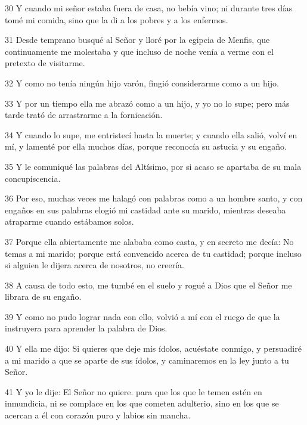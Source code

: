 \par 30 Y cuando mi señor estaba fuera de casa, no bebía vino; ni durante tres días tomé mi comida, sino que la di a los pobres y a los enfermos.

\par 31 Desde temprano busqué al Señor y lloré por la egipcia de Menfis, que continuamente me molestaba y que incluso de noche venía a verme con el pretexto de visitarme.

\par 32 Y como no tenía ningún hijo varón, fingió considerarme como a un hijo.

\par 33 Y por un tiempo ella me abrazó como a un hijo, y yo no lo supe; pero más tarde trató de arrastrarme a la fornicación.

\par 34 Y cuando lo supe, me entristecí hasta la muerte; y cuando ella salió, volví en mí, y lamenté por ella muchos días, porque reconocía su astucia y su engaño.

\par 35 Y le comuniqué las palabras del Altísimo, por si acaso se apartaba de su mala concupiscencia.

\par 36 Por eso, muchas veces me halagó con palabras como a un hombre santo, y con engaños en sus palabras elogió mi castidad ante su marido, mientras deseaba atraparme cuando estábamos solos.

\par 37 Porque ella abiertamente me alababa como casta, y en secreto me decía: No temas a mi marido; porque está convencido acerca de tu castidad; porque incluso si alguien le dijera acerca de nosotros, no creería.

\par 38 A causa de todo esto, me tumbé en el suelo y rogué a Dios que el Señor me librara de su engaño.

\par 39 Y como no pudo lograr nada con ello, volvió a mí con el ruego de que la instruyera para aprender la palabra de Dios.

\par 40 Y ella me dijo: Si quieres que deje mis ídolos, acuéstate conmigo, y persuadiré a mi marido a que se aparte de sus ídolos, y caminaremos en la ley junto a tu Señor.

\par 41 Y yo le dije: El Señor no quiere. para que los que le temen estén en inmundicia, ni se complace en los que cometen adulterio, sino en los que se acercan a él con corazón puro y labios sin mancha.

